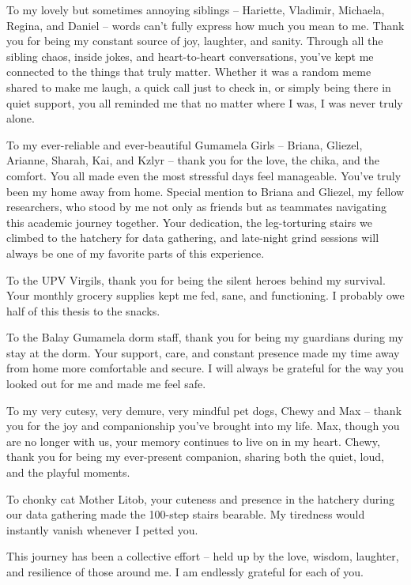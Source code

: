 To my lovely but sometimes annoying siblings – Hariette, Vladimir, Michaela, Regina, and Daniel – words can’t fully express how much you mean to me. Thank you for being my constant source of joy, laughter, and sanity. Through all the sibling chaos, inside jokes, and heart-to-heart conversations, you've kept me connected to the things that truly matter. Whether it was a random meme shared to make me laugh, a quick call just to check in, or simply being there in quiet support, you all reminded me that no matter where I was, I was never truly alone.

To my ever-reliable and ever-beautiful Gumamela Girls – Briana, Gliezel, Arianne, Sharah, Kai, and Kzlyr – thank you for the love, the chika, and the comfort. You all made even the most stressful days feel manageable. You’ve truly been my home away from home. Special mention to Briana and Gliezel, my fellow researchers, who stood by me not only as friends but as teammates navigating this academic journey together. Your dedication, the leg-torturing stairs we climbed to the hatchery for data gathering, and late-night grind sessions will always be one of my favorite parts of this experience.

To the UPV Virgils, thank you for being the silent heroes behind my survival. Your monthly grocery supplies kept me fed, sane, and functioning. I probably owe half of this thesis to the snacks.

To the Balay Gumamela dorm staff, thank you for being my guardians during my stay at the dorm. Your support, care, and constant presence made my time away from home more comfortable and secure. I will always be grateful for the way you looked out for me and made me feel safe.

To my very cutesy, very demure, very mindful pet dogs, Chewy and Max – thank you for the joy and companionship you’ve brought into my life. Max, though you are no longer with us, your memory continues to live on in my heart. Chewy, thank you for being my ever-present companion, sharing both the quiet, loud, and the playful moments.

To chonky cat Mother Litob, your cuteness and presence in the hatchery during our data gathering made the 100-step stairs bearable. My tiredness would instantly vanish whenever I petted you.

This journey has been a collective effort – held up by the love, wisdom, laughter, and resilience of those around me. I am endlessly grateful for each of you.



